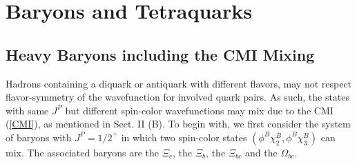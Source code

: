 \documentclass[12pt,prd,onecolumn,floatfix,nofootinbib]{revtex4}
\begin{document}
\section{Baryons and Tetraquarks}

\label{Hadrons}

\subsection{Heavy Baryons including the CMI Mixing}

Hadrons containing a diquark or antiquark with different flavors, may not
respect flavor-symmetry of the wavefunction for involved quark pairs. As
such, the states with same $J^{P}$ but different spin-color wavefunctions
may mix due to the CMI (\ref{CMI}), as mentioned in Sect. II (B). To begin
with, we first consider the system of baryons with $J^{P}={1/2}^{+}$ in
which two spin-color states $(\phi ^{B}\chi _{2}^{B},\phi ^{B}\chi _{3}^{B})$ 
can mix. The associated baryons are the $\Xi _{c}$, the $\Xi _{b}$, the $\Xi
_{bc}$ and the $\Omega _{bc}$.
\end{document}
